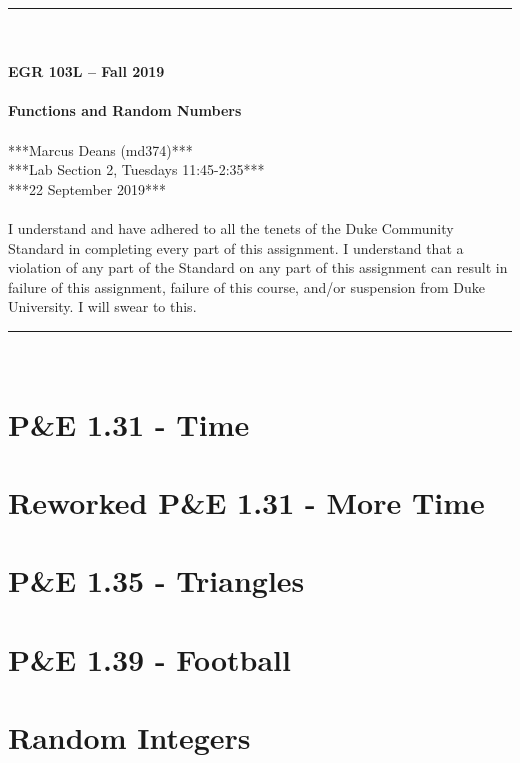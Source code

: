 \documentclass{article}
\begin{document}
\begin{center}
\rule{6.5in}{0.5mm}\\~\\
\textbf{\large EGR 103L -- Fall 2019}\\~\\
\textbf{\huge Functions and Random Numbers}\\~\\
***Marcus Deans (md374)***\\
***Lab Section 2, Tuesdays 11:45-2:35***\\
***22 September 2019***\\~\\
{\small I understand and have adhered to all the tenets of the Duke
  Community Standard in completing every part of this assignment.  I
  understand that a violation of any part of the Standard on any part
  of this assignment can result in failure of this assignment, failure
  of this course, and/or suspension from Duke University. I will swear to this.} 
\rule{6.5in}{0.5mm}\\
\end{center}
\tableofcontents
\listoffigures
\pagebreak

\section{P\&E 1.31 - Time}


\section{Reworked P\&E 1.31 - More Time}


\section{P\&E 1.35 - Triangles}


\section{P\&E 1.39 - Football}


\clearpage

\section{Random Integers}

\end{document}
